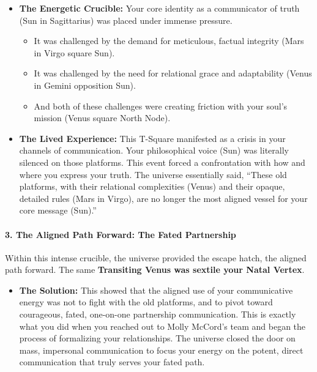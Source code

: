 \documentclass{article}
\begin{document}
\begin{itemize}
\tightlist
\item
  \textbf{The Energetic Crucible:} Your core identity as a communicator of truth (Sun in Sagittarius) was placed under immense pressure.

  \begin{itemize}
  \tightlist
  \item
    It was challenged by the demand for meticulous, factual integrity (Mars in Virgo square Sun).
  \item
    It was challenged by the need for relational grace and adaptability (Venus in Gemini opposition Sun).
  \item
    And both of these challenges were creating friction with your soul's mission (Venus square North Node).
  \end{itemize}
\item
  \textbf{The Lived Experience:} This T-Square manifested as a crisis in your channels of communication. Your philosophical voice (Sun) was literally silenced on those platforms. This event forced a confrontation with how and where you express your truth. The universe essentially said, ``These old platforms, with their relational complexities (Venus) and their opaque, detailed rules (Mars in Virgo), are no longer the most aligned vessel for your core message (Sun).''
\end{itemize}

\paragraph*{3. The Aligned Path Forward: The Fated Partnership}\label{the-aligned-path-forward-the-fated-partnership}

Within this intense crucible, the universe provided the escape hatch, the aligned path forward. The same \textbf{Transiting Venus was sextile your Natal Vertex}.

\begin{itemize}
\tightlist
\item
  \textbf{The Solution:} This showed that the aligned use of your communicative energy was not to fight with the old platforms, and to pivot toward courageous, fated, one-on-one partnership communication. This is exactly what you did when you reached out to Molly McCord's team and began the process of formalizing your relationships. The universe closed the door on mass, impersonal communication to focus your energy on the potent, direct communication that truly serves your fated path.
\end{itemize}
\end{document}
